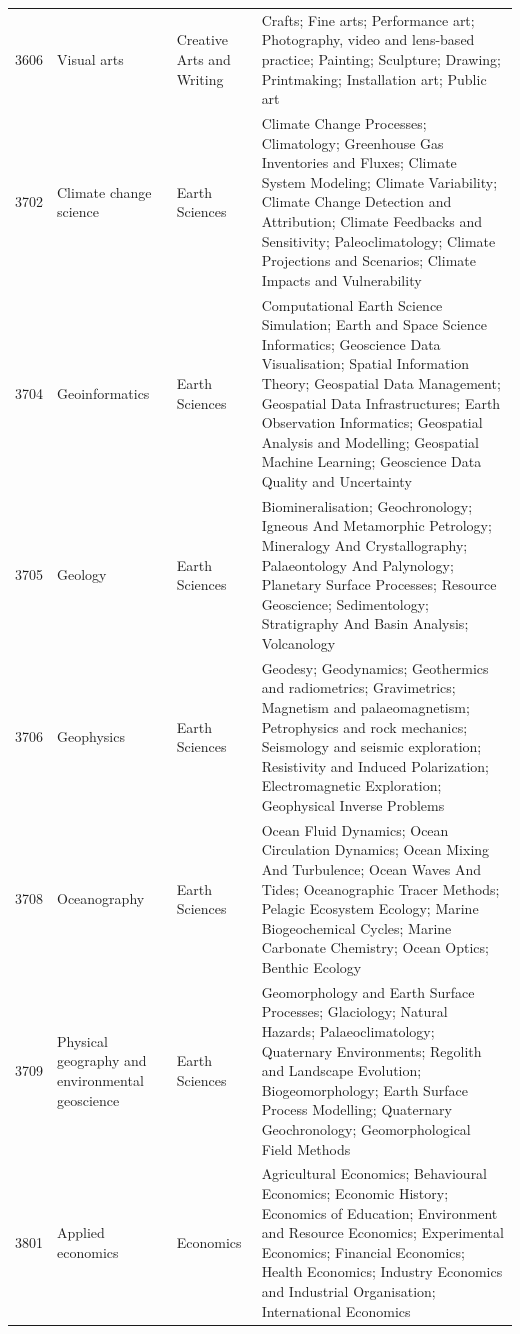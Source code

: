 \begin{longtable}{r p{2.45cm} p{2.55cm} p{6.15cm}}
3606 & Visual arts & Creative Arts and Writing & Crafts; Fine arts; Performance art; Photography, video and lens-based practice; Painting; Sculpture; Drawing; Printmaking; Installation art; Public art \\
3702 & Climate change science & Earth Sciences & Climate Change Processes; Climatology; Greenhouse Gas Inventories and Fluxes; Climate System Modeling; Climate Variability; Climate Change Detection and Attribution; Climate Feedbacks and Sensitivity; Paleoclimatology; Climate Projections and Scenarios; Climate Impacts and Vulnerability \\
3704 & Geoinformatics & Earth Sciences & Computational Earth Science Simulation; Earth and Space Science Informatics; Geoscience Data Visualisation; Spatial Information Theory; Geospatial Data Management; Geospatial Data Infrastructures; Earth Observation Informatics; Geospatial Analysis and Modelling; Geospatial Machine Learning; Geoscience Data Quality and Uncertainty \\
3705 & Geology & Earth Sciences & Biomineralisation; Geochronology; Igneous And Metamorphic Petrology; Mineralogy And Crystallography; Palaeontology And Palynology; Planetary Surface Processes; Resource Geoscience; Sedimentology; Stratigraphy And Basin Analysis; Volcanology \\
3706 & Geophysics & Earth Sciences & Geodesy; Geodynamics; Geothermics and radiometrics; Gravimetrics; Magnetism and palaeomagnetism; Petrophysics and rock mechanics; Seismology and seismic exploration; Resistivity and Induced Polarization; Electromagnetic Exploration; Geophysical Inverse Problems \\
3708 & Oceanography & Earth Sciences & Ocean Fluid Dynamics; Ocean Circulation Dynamics; Ocean Mixing And Turbulence; Ocean Waves And Tides; Oceanographic Tracer Methods; Pelagic Ecosystem Ecology; Marine Biogeochemical Cycles; Marine Carbonate Chemistry; Ocean Optics; Benthic Ecology \\
3709 & Physical geography and environmental geoscience & Earth Sciences & Geomorphology and Earth Surface Processes; Glaciology; Natural Hazards; Palaeoclimatology; Quaternary Environments; Regolith and Landscape Evolution; Biogeomorphology; Earth Surface Process Modelling; Quaternary Geochronology; Geomorphological Field Methods \\
3801 & Applied economics & Economics & Agricultural Economics; Behavioural Economics; Economic History; Economics of Education; Environment and Resource Economics; Experimental Economics; Financial Economics; Health Economics; Industry Economics and Industrial Organisation; International Economics \\

\end{longtable}
